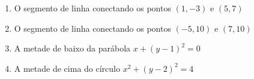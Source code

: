 \begin{enumerate}[label=\textbf{\arabic*.},leftmargin=*]
\begin{tabular}{@{}m{}m{}@{}}
    \item $\displaystyle f(x)=x+|x|$&
    \item $\displaystyle f(x)=|x+2|$\\
    \item $\displaystyle g(t)=|1-3t|$&
    \item $\displaystyle h(t)=|t|+|t+1|$\\
    \item $\displaystyle f(x)=\begin{cases}
    |x| & \text{ se } |x|\leq 1\\
    1 & \text{ se } |x| > 1
    \end{cases}$&
    \item $\displaystyle g(x)=\left||x|-1\right|$
  \end{tabular}
  \NoIndent{\hspace{-0.2cm}\rule{1.02\columnwidth}{0.5pt}}
  \vspace{0.1cm}
  \item O segmento de linha conectando os pontos $(1,-3)$ e $(5,7)$
  \item O segmento de linha conectando os pontos $(-5,10)$ e $(7,10)$
  \item[\difficultQuestion] A metade de baixo da parábola $x+(y-1)^2=0$
  \item A metade de cima do círculo $x^2+(y-2)^2=4$
  

\end{enumerate}
